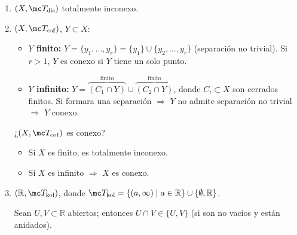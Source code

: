 \begin{ejems}
\begin{enumerate}
\begin{enumerate}
        Adem\'as $X$ es conexo porque $A\subset X \equiv A\cap X \neq \emptyset$. 
    \end{enumerate}
\begin{ejer}
    $(X, \mc T^A)$ es igual que la de $\mc T_A$, basta estudiarlo por cerrados.  
\end{ejer}
    \item $(X, \mc T_{\mathrm{dis}})$ totalmente inconexo.
    \item $(X, \mc T_{\mathrm{cof}})$, $Y \subset X$:
    \begin{itemize}
        \item \textbf{$Y$ finito:} $Y = \{y_1, \dots, y_r\} = \{y_1\} \cup \{y_2, \dots, y_r\}$ (separación no trivial). Si $r > 1$, $Y$ es conexo si $Y$ tiene un solo punto.
        \item \textbf{$Y$ infinito:} $Y = \overbrace{(C_1 \cap Y)}^{\text{finito}} \cup \overbrace{(C_2 \cap Y)}^{\text{finito}}$, donde $C_i \subset X$ son cerrados finitos. Si formara una separación $\Rightarrow$ $Y$ no admite separación no trivial $\Rightarrow$ $Y$ conexo.
    \end{itemize}
\noindent ¿$(X, \mc T_{\mathrm{cof}})$ es conexo?
\begin{itemize}
    \item Si $X$ es finito, es totalmente inconexo.
    \item Si $X$ es infinito $\Rightarrow$ $X$ es conexo.
\end{itemize}
    \item $(\mathbb{R}, \mc T_{\mathrm{kol}})$, donde $\mc T_{\mathrm{kol}} = \{(a, \infty) \mid a \in \mathbb{R}\} \cup \{\emptyset, \mathbb{R}\}$.

    Sean $U, V \subset \mathbb{R}$ abiertos; entonces $U \cap V \in \{U, V\}$ (si son no vacíos y están anidados).


\end{enumerate}
\end{ejems}
